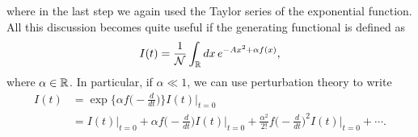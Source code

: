 where in the last step we again used the Taylor series of the exponential function. All this discussion becomes quite useful if the generating functional is defined as 
\begin{equation}
    I(t) = \frac{1}{\mathcal{N}}\int_{\mathbb{R}} dx\,e^{-Ax^2 + \alpha f(x)},
\end{equation}
where $\alpha \in \mathbb{R}$. In particular, if $\alpha \ll 1$, we can use perturbation theory to write 
\begin{equation}
    \begin{split}
        I(t) &= \exp{\bigg\{\alpha f\bigg(-\frac{d}{dt}\bigg)\bigg\}}I(t)\bigg|_{t = 0} \\
        &= I(t)|_{t = 0} + \alpha f\bigg(-\frac{d}{dt}\bigg)I(t)\bigg|_{t = 0} + \frac{\alpha^2}{2!}f\bigg(-\frac{d}{dt}\bigg)^2I(t)\bigg|_{t = 0} + \cdots.
    \end{split}
\end{equation}

